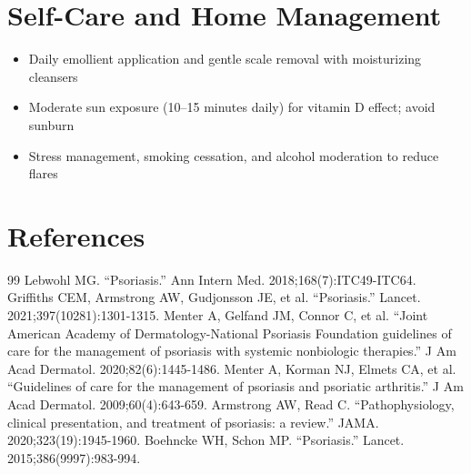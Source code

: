 \section*{Self-Care and Home Management}
\begin{itemize}
  \item Daily emollient application and gentle scale removal with moisturizing cleansers
  \item Moderate sun exposure (10--15 minutes daily) for vitamin D effect; avoid sunburn
  \item Stress management, smoking cessation, and alcohol moderation to reduce flares
\end{itemize}

\section*{References}
\begin{thebibliography}{99}
 Lebwohl MG. ``Psoriasis.'' Ann Intern Med. 2018;168(7):ITC49-ITC64.
 Griffiths CEM, Armstrong AW, Gudjonsson JE, et al. ``Psoriasis.'' Lancet. 2021;397(10281):1301-1315.
 Menter A, Gelfand JM, Connor C, et al. ``Joint American Academy of Dermatology-National Psoriasis Foundation guidelines of care for the management of psoriasis with systemic nonbiologic therapies.'' J Am Acad Dermatol. 2020;82(6):1445-1486.
 Menter A, Korman NJ, Elmets CA, et al. ``Guidelines of care for the management of psoriasis and psoriatic arthritis.'' J Am Acad Dermatol. 2009;60(4):643-659.
 Armstrong AW, Read C. ``Pathophysiology, clinical presentation, and treatment of psoriasis: a review.'' JAMA. 2020;323(19):1945-1960.
 Boehncke WH, Schon MP. ``Psoriasis.'' Lancet. 2015;386(9997):983-994.
\end{thebibliography}

